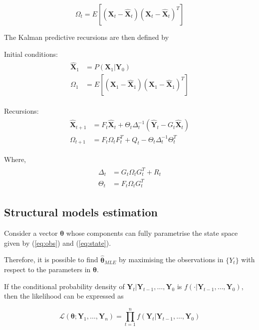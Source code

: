 \begin{equation}
	\Omega_t = E[(\bm{X}_t - \hat{\bm{X}}_t)(\bm{X}_t - \hat{\bm{X}}_t)^T]
\end{equation}

The Kalman predictive recursions are then defined by

Initial conditions:
\begin{align}\label{eq:kalm_pred_init}
\begin{split}
		\hat{\bm{X}}_1 &= P(\bm{X}_1 | \bm{Y}_0) \\
		\Omega_1 &= E[(\bm{X}_1 - \hat{\bm{X}}_1)(\bm{X}_1 - \hat{\bm{X}}_1)^T]
\end{split}
\end{align}

Recursions:
\begin{align}\label{eq:kalm_pred_1}
\begin{split}
	\hat{\bm{X}}_{t+1} &= F_t\hat{\bm{X}}_t + \Theta_t\Delta_t^{-1}(\hat{\bm{Y}}_t - G_t\hat{\bm{X}}_t) \\
	\Omega_{t+1} &= F_t \Omega_t F_t^T + Q_t - \Theta_t \Delta_t^{-1} \Theta_t^T 
\end{split}
\end{align}

Where,
\begin{align}\label{eq:kalm_pred_2}
\begin{split}
	\Delta_t &= G_t \Omega_t G_t^T + R_t \\
	\Theta_t &= F_t \Omega_t G_t^T
\end{split}
\end{align}

\subsection{Structural models estimation}

Consider a vector $\bm{\theta}$ whose components can fully parametrise the state space given by (\ref{eq:obs}) and (\ref{eq:state}).

Therefore, it is possible to find $\bm{\hat{\bm{\theta}}}_{MLE}$ by maximising the observations in $\{Y_t\}$ with respect to the parameters in $\bm{\theta}$.

If the conditional probability density of $\bm{Y}_t | \bm{Y}_{t-1}, \ldots, \bm{Y}_0$ is $f(\cdot | \bm{Y}_{t-1}, \ldots, \bm{Y}_0)$, then the likelihood can be expressed as 

\begin{equation}\label{eq:structts_lik_1}
	\mathcal{L}(\bm{\theta} ; \bm{Y}_1, \ldots, \bm{Y}_n) = \prod_{t=1}^{n}{f(\bm{Y}_t | \bm{Y}_{t-1}, \ldots, \bm{Y}_0)}
\end{equation}

